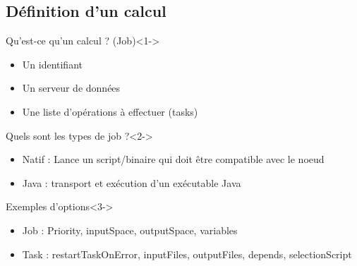 \documentclass{beamer}
\begin{document}
\subsection{Définition d'un calcul}
\begin{frame}
	\tableofcontents[currentsubsection]
\end{frame}
\begin{frame}
        \begin{block}{Qu'est-ce qu'un calcul ? (Job)}<1->
            \begin{itemize}
                \item Un identifiant
                \item Un serveur de données
                \item Une liste d'opérations à effectuer (tasks)%
            \end{itemize}
        \end{block}
        \begin{exampleblock}{Quels sont les types de job ?}<2->
            \begin{itemize}
                \item Natif : Lance un script/binaire qui doit être compatible avec le noeud
                \item Java : transport et exécution d'un exécutable Java
            \end{itemize}
        \end{exampleblock}
        \begin{exampleblock}{Exemples d'options}<3->
            \begin{itemize}
                \item Job : Priority, inputSpace, outputSpace, variables
                \item Task : restartTaskOnError, inputFiles, outputFiles, depends, selectionScript
            \end{itemize}
        \end{exampleblock}
\end{frame}
\end{document}
